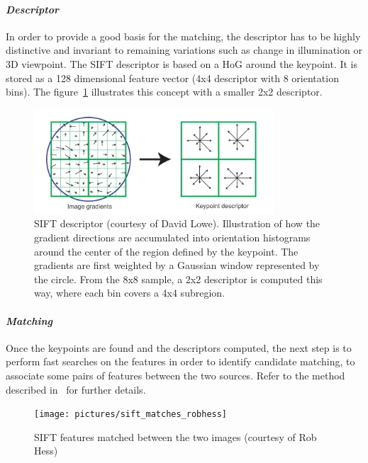 \paragraph{\emph{Descriptor}}

In order to provide a good basis for the matching, the descriptor has to be highly distinctive and invariant to remaining variations such as change in illumination or 3D viewpoint. The \gls{SIFT} descriptor is based on a \gls{HoG} around the keypoint. It is stored as a 128 dimensional feature vector (4x4 descriptor with 8 orientation bins). The figure~\ref{fig:sift_descriptor} illustrates this concept with a smaller 2x2 descriptor.

\begin{figure}[h]
\centering
\includegraphics[width=0.8\textwidth]{figures/sift_descriptor}
\caption{SIFT descriptor (courtesy of David Lowe). Illustration of how the gradient directions are accumulated into orientation histograms around the center of the region defined by the keypoint. The gradients are first weighted by a Gaussian window represented by the circle. From the 8x8 sample, a 2x2 descriptor is computed this way, where each bin covers a 4x4 subregion.}
\label{fig:sift_descriptor}
\end{figure}

\clearpage
\paragraph{\emph{Matching}}

Once the keypoints are found and the descriptors computed, the next step is to perform fast searches on the features in order to identify candidate matching, to associate some pairs of features between the two sources. Refer to the method described in~\cite{lowe_2004_sift} for further details.

\begin{figure}[h]
\centering
\texttt{[image: pictures/sift\_matches\_robhess]}
\caption{SIFT features matched between the two images (courtesy of Rob Hess)}
\end{figure}

